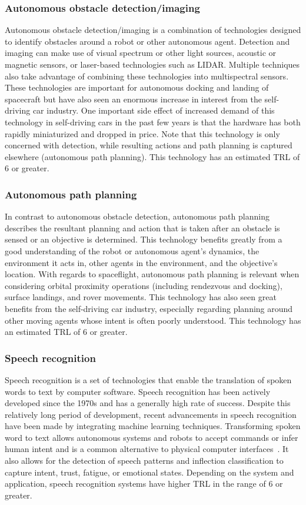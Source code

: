 \subsubsection{Autonomous obstacle detection/imaging}
Autonomous obstacle detection/imaging is a combination of technologies designed to identify obstacles around a robot or other autonomous agent.
Detection and imaging can make use of visual spectrum or other light sources, acoustic or magnetic sensors, or laser-based technologies such as LIDAR.
Multiple techniques also take advantage of combining these technologies into multispectral sensors.
These technologies are important for autonomous docking and landing of spacecraft but have also seen an enormous increase in interest from the self-driving car industry.
One important side effect of increased demand of this technology in self-driving cars in the past few years is that the hardware has both rapidly miniaturized and dropped in price.
Note that this technology is only concerned with detection, while resulting actions and path planning is captured elsewhere (autonomous path planning).
This technology has an estimated TRL of 6 or greater.

\subsubsection{Autonomous path planning}
In contrast to autonomous obstacle detection, autonomous path planning describes the resultant planning and action that is taken after an obstacle is sensed or an objective is determined.
This technology benefits greatly from a good understanding of the robot or autonomous agent's dynamics, the environment it acts in, other agents in the environment, and the objective's location.
With regards to spaceflight, autonomous path planning is relevant when considering orbital proximity operations (including rendezvous and docking), surface landings, and rover movements.
This technology has also seen great benefits from the self-driving car industry, especially regarding planning around other moving agents whose intent is often poorly understood.
This technology has an estimated TRL of 6 or greater.

\subsubsection{Speech recognition}
Speech recognition is a set of technologies that enable the translation of spoken words to text by computer software.
Speech recognition has been actively developed since the 1970s and has a generally high rate of success.
Despite this relatively long period of development, recent advancements in speech recognition have been made by integrating machine learning techniques.
Transforming spoken word to text allows autonomous systems and robots to accept commands or infer human intent and is a common alternative to physical computer interfaces~\citep{tsarouchi_humanrobot_2016}.
It also allows for the detection of speech patterns and inflection classification to capture intent, trust, fatigue, or emotional states.
Depending on the system and application, speech recognition systems have higher TRL in the range of 6 or greater.


